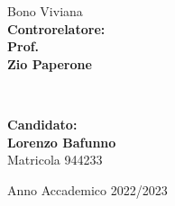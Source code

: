 \begin{titlepage}
\begin{minipage}[t]{0.47\textwidth}
        {\large{
                Bono Viviana
            }}
        \vspace{8mm}
        {\large{\bf \\ Controrelatore:\\
                Prof.\\
                Zio Paperone}}
    \end{minipage}
    \\
    \null\hfill
    \begin{minipage}[t]{0.40\textwidth}
        \vspace{20mm}
        {\large{\bf Candidato:\\
                Lorenzo Bafunno\\
            } \large{Matricola 944233}}
    \end{minipage}
    \vspace{10mm}
    \begin{center}
        {\large{Anno Accademico 2022/2023}}
    \end{center}

\end{titlepage}
